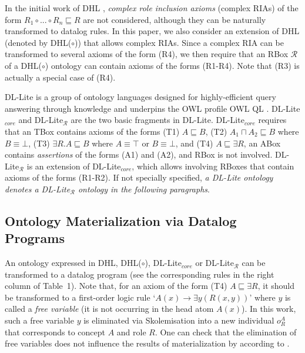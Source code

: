 In the initial work of DHL \cite{GrosofHVD03}, \emph{complex role inclusion axioms} (complex RIAs) of
the form $R_1\circ...\circ R_n\sqsubseteq R$ are not considered, although they can be
naturally transformed to datalog rules.
In this paper, we also consider an extension of DHL (denoted by DHL($\circ$))
that allows complex RIAs. Since a complex RIA can be transformed to
several axioms of the form (R4), we then require that an
RBox $\mathcal{R}$ of a DHL($\circ$) ontology can contain
axioms of the forms (R1-R4). Note that (R3) is actually a special
case of (R4).

DL-Lite is a group of ontology languages designed for highly-efficient
query answering through knowledge
and underpins the OWL profile OWL QL \cite{CalvaneseGLLR07}.
DL-Lite$_{core}$ and DL-Lite$_{\mathcal{R}}$ are the two basic fragments
in DL-Lite.
DL-Lite$_{core}$ requires that an TBox contains axioms of the forms (T1) $A\sqsubseteq B$,
(T2) $A_1\sqcap A_2\sqsubseteq B$ where $B\equiv\bot$, (T3) $\exists R.A\sqsubseteq B$
where $A\equiv\top$ or $B\equiv\bot$, and (T4) $A\sqsubseteq\exists R$,
an ABox contains \emph{assertions} of the forms (A1) and (A2), and
RBox is not involved. DL-Lite$_{\mathcal{R}}$ is an extension of DL-Lite$_{core}$,
which allows involving RBoxes that contain axioms of the forms (R1-R2).
If not specially specified, \emph{a DL-Lite ontology denotes a DL-Lite$_{\mathcal{R}}$ ontology
in the following paragraphs}.


\subsection{Ontology Materialization via Datalog Programs}

An ontology
expressed in DHL, DHL($\circ$), DL-Lite$_{core}$ or DL-Lite$_{\mathcal{R}}$ can be transformed to a datalog program
(see the corresponding rules in the right column of Table~1).
Note that, for an axiom of the form (T4) $A\sqsubseteq\exists R$, it should be transformed to
a first-order logic rule `$A(x)\rightarrow \exists y(R(x,y))$' where $y$ is called a \emph{free variable} (it is
not occurring in the head atom $A(x)$).
In this work, such a free variable $y$ is eliminated via Skolemisation into a new individual $o_{R}^A$
that corresponds to concept $A$ and role $R$. One can check that the elimination of free variables
does not influence the results of materialization by according to \cite{CalvaneseGLLR07}.

